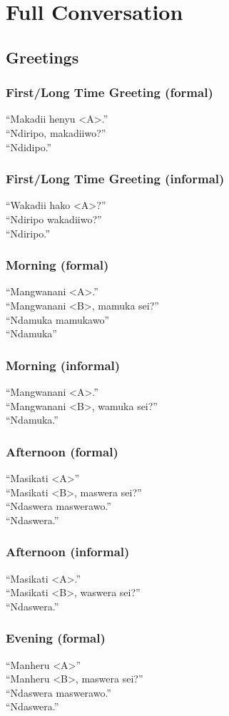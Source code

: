\documentclass[12pt]{article}
\newcommand{\tl}[2]{``#1''\\\textit{#2}}
\begin{document}
\section{Full Conversation}

\subsection{Greetings}
\subsubsection{First/Long Time Greeting (formal)}
\tl{Makadii henyu <A>.}{}
\tl{Ndiripo, makadiiwo?}{}
\tl{Ndidipo.}{}

\subsubsection{First/Long Time Greeting (informal)}
\tl{Wakadii hako <A>?}{}
\tl{Ndiripo wakadiiwo?}{}
\tl{Ndiripo.}{}

\subsubsection{Morning (formal)}
\tl{Mangwanani <A>.}{}
\tl{Mangwanani <B>, mamuka sei?}{}
\tl{Ndamuka mamukawo}{}
\tl{Ndamuka}{}

\subsubsection{Morning (informal)}
\tl{Mangwanani <A>.}{}
\tl{Mangwanani <B>, wamuka sei?}{}
\tl{Ndamuka.}{}

\subsubsection{Afternoon (formal)}
\tl{Masikati <A>}{}
\tl{Masikati <B>, maswera sei?}{}
\tl{Ndaswera maswerawo.}{}
\tl{Ndaswera.}{}

\subsubsection{Afternoon (informal)}
\tl{Masikati <A>.}{}
\tl{Masikati <B>, waswera sei?}{}
\tl{Ndaswera.}{}

\subsubsection{Evening (formal)}
\tl{Manheru <A>}{}
\tl{Manheru <B>, maswera sei?}{}
\tl{Ndaswera maswerawo.}{}
\tl{Ndaswera.}{}
\end{document}

